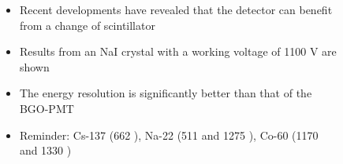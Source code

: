 \begin{frame}[plain]
\begin{columns}
\begin{column}{0.5\textwidth}
\begin{figure}
            \end{figure}
        \end{column}
        \begin{column}{0.5\textwidth}
            \begin{itemize}
                \item Recent developments have revealed that the detector can benefit from a change of scintillator
                \item Results from an NaI crystal with a working voltage of 1100 \si{\volt} are shown
                \item The energy resolution is significantly better than that of the BGO-PMT
                \item Reminder: Cs-137 (662 \keV), Na-22 (511 \keV and 1275 \keV), Co-60 (1170 and 1330 \keV)
            \end{itemize}

            \vspace{0.5cm}
        \end{column}
    \end{columns}
\end{frame}

